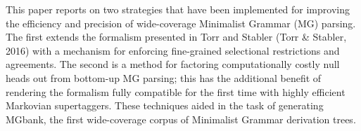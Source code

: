 This paper reports on two strategies that have been implemented for improving the efficiency and precision of wide-coverage Minimalist Grammar (MG) parsing.  The first extends the formalism presented in Torr and Stabler (Torr \& Stabler, 2016) with a mechanism for enforcing fine-grained selectional restrictions and agreements.  The second is a method for factoring computationally costly null heads out from bottom-up MG parsing; this has the additional benefit of rendering the formalism fully compatible for the first time with highly efficient Markovian supertaggers.  These techniques aided in the task of generating MGbank, the first wide-coverage corpus of Minimalist Grammar derivation trees.
